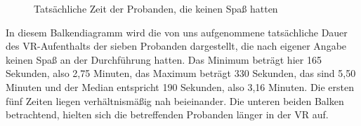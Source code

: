 \documentclass{Paper}
\begin{document}
	\begin{figure}[H]
  \caption{Tatsächliche Zeit der Probanden, die keinen Spaß hatten}
  \label{ZeitKeinSpass}
	\end{figure}
In diesem Balkendiagramm wird die von uns aufgenommene tatsächliche Dauer des VR-Aufenthalts der sieben Probanden dargestellt, die nach eigener Angabe keinen Spaß an der Durchführung hatten. Das Minimum beträgt hier 165 Sekunden, also 2,75 Minuten, das Maximum beträgt 330 Sekunden, das sind 5,50 Minuten und der Median entspricht 190 Sekunden, also 3,16 Minuten. Die ersten fünf Zeiten liegen verhältnismäßig nah beieinander. Die unteren beiden Balken betrachtend, hielten sich die betreffenden Probanden länger in der VR auf.
\end{document}
